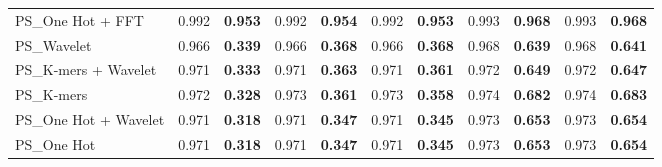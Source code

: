 \begin{table*}[htbp]
\begin{tabular}{lcccccccccc}
PS\_One Hot + FFT & 0.992 & \textbf{0.953} & 0.992 & \textbf{0.954} & 0.992 & \textbf{0.953} & 0.993 & \textbf{0.968} & 0.993 & \textbf{0.968} \\
PS\_Wavelet & 0.966 & \textbf{0.339} & 0.966 & \textbf{0.368} & 0.966 & \textbf{0.368} & 0.968 & \textbf{0.639} & 0.968 & \textbf{0.641} \\
PS\_K-mers + Wavelet & 0.971 & \textbf{0.333} & 0.971 & \textbf{0.363} & 0.971 & \textbf{0.361} & 0.972 & \textbf{0.649} & 0.972 & \textbf{0.647} \\
PS\_K-mers & 0.972 & \textbf{0.328} & 0.973 & \textbf{0.361} & 0.973 & \textbf{0.358} & 0.974 & \textbf{0.682} & 0.974 & \textbf{0.683} \\
PS\_One Hot + Wavelet & 0.971 & \textbf{0.318} & 0.971 & \textbf{0.347} & 0.971 & \textbf{0.345} & 0.973 & \textbf{0.653} & 0.973 & \textbf{0.654} \\
PS\_One Hot & 0.971 & \textbf{0.318} & 0.971 & \textbf{0.347} & 0.971 & \textbf{0.345} & 0.973 & \textbf{0.653} & 0.973 & \textbf{0.654} \\
\bottomrule
\end{tabular}
\end{table*}

